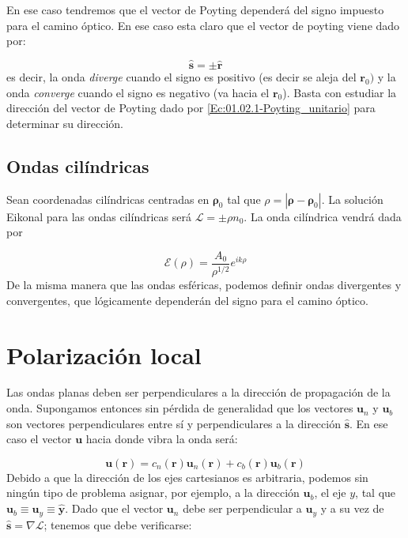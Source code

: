 \documentclass[12pt,a4paper]{book}
\numberwithin{equation}{section}
\numberwithin{figure}{section}
\newcommand{\1}{_{(1)}}
\newcommand{\2}{_{(2)}}
\newcommand{\yn}{\mathbf{y}}
\newcommand{\un}{\mathbf{u}}
\newcommand{\rn}{\mathbf{r}}
\newcommand{\sn}{\mathbf{s}}
\newcommand{\rhon}{\mathbf{\rho}}
\newcommand{\hns}{\hat{\sn}}
\newcommand{\hnr}{\hat{\rn}}
\newcommand{\hny}{\hat{\yn}}
\theoremstyle{definition}
\begin{document}
En ese caso tendremos que el vector de Poyting dependerá del signo impuesto para el camino óptico. En ese caso esta claro que el vector de poyting viene dado por:

\begin{equation}
\hns = \pm \hnr
\end{equation} 
es decir, la onda \textit{diverge} cuando el signo es positivo (es decir se aleja del $\rn_0)$ y la onda \textit{converge} cuando el signo es negativo (va hacia el $\rn_0$). Basta con estudiar la dirección del vector de Poyting dado por \ref{Ec:01.02.1-Poyting_unitario} para determinar su dirección. 

\subsection{Ondas cilíndricas}

Sean coordenadas cilíndricas centradas en $\rhon_0$ tal que $\rho = | \rhon - \rhon_0|$. La solución Eikonal para las ondas cilíndricas será $\mathcal{L} = \pm \rho n_0$. La onda cilíndrica vendrá dada por

\begin{equation}
\mathcal{E} (\rho) = \dfrac{A_0}{\rho^{1/2}} e^{i k \rho}
\end{equation}
De la misma manera que las ondas esféricas, podemos definir ondas divergentes y convergentes, que lógicamente dependerán del signo para el camino óptico.


\section{Polarización local}

Las ondas planas deben ser perpendiculares a la dirección de propagación de la onda. Supongamos entonces sin pérdida de generalidad que los vectores $\un_n$ y $\un_b$ son vectores perpendiculares entre sí y perpendiculares a la dirección $\hns$. En ese caso el vector $\un$ hacia donde vibra la onda será:

\begin{equation}
\un (\rn) = c_n (\rn) \un_n (\rn) + c_b (\rn) \un_b (\rn)
\end{equation}
Debido a que la dirección de los ejes cartesianos es arbitraria, podemos sin ningún tipo de problema asignar, por ejemplo, a la dirección $\un_b$, el eje $y$, tal que $\un_b \equiv \un_y \equiv  \hny$. Dado que el vector $\un_n$ debe ser perpendicular a $\un_y$ y a su vez de $\hns = \nabla \mathcal{L}$; tenemos que debe verificarse:
\end{document}
